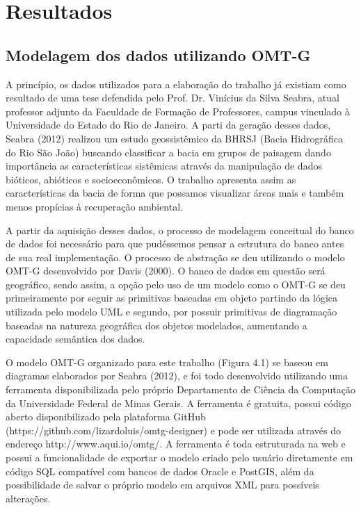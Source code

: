 \chapter{Resultados}
\section{Modelagem dos dados utilizando OMT-G}
A princípio, os dados utilizados para a elaboração do trabalho já existiam como resultado de uma tese defendida pelo Prof. Dr. Vinícius da Silva Seabra, atual professor adjunto da Faculdade de Formação de Professores, campus vinculado à Universidade do Estado do Rio de Janeiro. A parti da geração desses dados, Seabra (2012) realizou um estudo geossistêmico da BHRSJ (Bacia Hidrográfica do Rio São João) buscando classificar a bacia em grupos de paisagem dando importância as características sistêmicas através da manipulação de dados bióticos, abióticos e socioeconômicos. O trabalho apresenta assim as características da bacia de forma que possamos visualizar áreas mais e também menos propícias à recuperação ambiental.

A partir da aquisição desses dados, o processo de modelagem conceitual do banco de dados foi necessário para que pudéssemos pensar a estrutura do banco antes de sua real implementação. O processo de abstração se deu utilizando o modelo OMT-G desenvolvido por Davis (2000). O banco de dados em questão será geográfico, sendo assim, a opção pelo uso de um modelo como o OMT-G se deu primeiramente por seguir as primitivas baseadas em objeto partindo da lógica utilizada pelo modelo UML e segundo, por possuir primitivas de diagramação baseadas na natureza geográfica dos objetos modelados, aumentando a capacidade semântica dos dados.

O modelo OMT-G organizado para este trabalho (Figura 4.1) se baseou em diagramas elaborados por Seabra (2012), e foi todo desenvolvido utilizando uma ferramenta disponibilizada pelo próprio Departamento de Ciência da Computação da Universidade Federal de Minas Gerais. A ferramenta é gratuita, possui código aberto disponibilizado pela plataforma GitHub (https://github.com/lizardoluis/omtg-designer) e pode ser utilizada através do endereço http://www.aqui.io/omtg/. A ferramenta é toda estruturada na web e possui a funcionalidade de exportar o modelo criado pelo usuário diretamente em código SQL compatível com bancos de dados Oracle e PostGIS, além da possibilidade de salvar o próprio modelo em arquivos XML para possíveis alterações.

